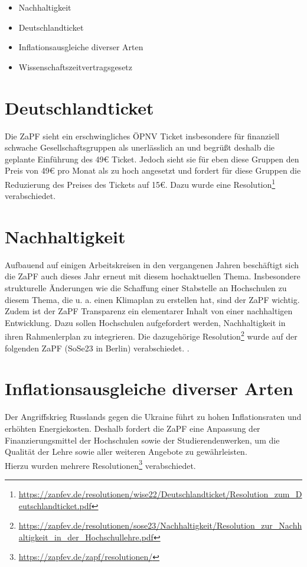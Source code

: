 \documentclass{scrartcl}
\begin{document}
	\begin{itemize}
		\item Nachhaltigkeit
		\item Deutschlandticket
		\item Inflationsausgleiche diverser Arten
		\item Wissenschaftszeitvertragsgesetz
	\end{itemize}
	
	\section*{Deutschlandticket}
	Die ZaPF sieht  ein erschwingliches ÖPNV Ticket insbesondere für finanziell schwache Gesellschaftsgruppen als unerlässlich an und begrüßt deshalb die geplante Einführung des \si{49}{€} Ticket. Jedoch sieht sie für eben diese Gruppen den Preis von \si{49}{€} pro Monat als zu hoch angesetzt und fordert für diese Gruppen die Reduzierung des Preises des Tickets auf \si{15}{€}. Dazu wurde eine Resolution\footnote{\url{https://zapfev.de/resolutionen/wise22/Deutschlandticket/Resolution_zum_Deutschlandticket.pdf}} verabschiedet.
	
	\section*{Nachhaltigkeit}
	Aufbauend auf einigen Arbeitskreisen in den vergangenen Jahren beschäftigt sich die ZaPF auch dieses Jahr erneut mit diesem hochaktuellen Thema. Insbesondere strukturelle Änderungen wie die Schaffung einer Stabstelle an Hochschulen zu diesem Thema, die u. a. einen Klimaplan zu erstellen hat, sind der ZaPF wichtig.\\
	Zudem ist der ZaPF Transparenz ein elementarer Inhalt von einer nachhaltigen Entwicklung. Dazu sollen Hochschulen aufgefordert werden, Nachhaltigkeit in ihren Rahmenlerplan zu integrieren. Die dazugehörige Resolution\footnote{\url{https://zapfev.de/resolutionen/sose23/Nachhaltigkeit/Resolution_zur_Nachhaltigkeit_in_der_Hochschullehre.pdf}} wurde auf der folgenden ZaPF (SoSe23 in Berlin) verabschiedet.
	.
	
	
	
	\section*{Inflationsausgleiche diverser Arten}
	Der Angriffskrieg Russlands gegen die Ukraine führt zu hohen Inflationsraten und erhöhten Energiekosten. Deshalb fordert die ZaPF eine Anpassung der Finanzierungsmittel der Hochschulen sowie der Studierendenwerken, um die Qualität der Lehre sowie aller weiteren Angebote zu gewährleisten.\\
	Hierzu wurden mehrere Resolutionen\footnote{\url{https://zapfev.de/zapf/resolutionen/}} verabschiedet.
	
\end{document}
